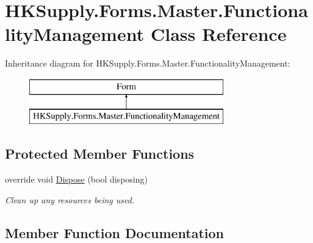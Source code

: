 \hypertarget{class_h_k_supply_1_1_forms_1_1_master_1_1_functionality_management}{}\section{H\+K\+Supply.\+Forms.\+Master.\+Functionality\+Management Class Reference}
\label{class_h_k_supply_1_1_forms_1_1_master_1_1_functionality_management}
Inheritance diagram for H\+K\+Supply.\+Forms.\+Master.\+Functionality\+Management\+:\begin{figure}[H]
\begin{center}
\leavevmode
\includegraphics[height=2.000000cm]{class_h_k_supply_1_1_forms_1_1_master_1_1_functionality_management}
\end{center}
\end{figure}
\subsection*{Protected Member Functions}
\begin{DoxyCompactItemize}
\item 
override void \hyperlink{class_h_k_supply_1_1_forms_1_1_master_1_1_functionality_management_a36e30f6560cd85f1d5369dadd79487d4}{Dispose} (bool disposing)
\begin{DoxyCompactList}\small\item\em Clean up any resources being used. \end{DoxyCompactList}\end{DoxyCompactItemize}


\subsection{Member Function Documentation}
\mbox{\label{class_h_k_supply_1_1_forms_1_1_master_1_1_functionality_management_a36e30f6560cd85f1d5369dadd79487d4}} 
